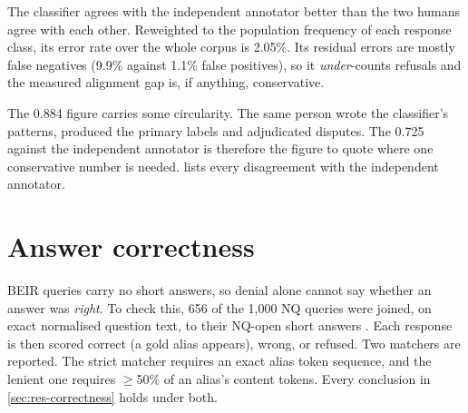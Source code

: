 The classifier agrees with the independent annotator better than the two humans
agree with each other. Reweighted to the population frequency of each response
class, its error rate over the whole corpus is 2.05\%. Its residual errors are
mostly false negatives (9.9\% against 1.1\% false positives), so it
\emph{under}-counts refusals and the measured alignment gap is, if anything,
conservative.

The 0.884 figure carries some circularity. The same person wrote the
classifier's patterns, produced the primary labels and adjudicated disputes. The
0.725 against the independent annotator is therefore the figure to quote where
one conservative number is needed.  lists every
disagreement with the independent annotator.

\section{Answer correctness}
\label{sec:correctness}

BEIR queries carry no short answers, so denial alone cannot say whether an
answer was \emph{right}. To check this, 656 of the 1{,}000 NQ queries were
joined, on exact normalised question text, to their NQ-open short answers
\cite{lee2019latent}. Each response is then scored correct (a gold alias
appears), wrong, or refused. Two matchers are reported. The strict matcher
requires an exact alias token sequence, and the lenient one requires $\geq$50\%
of an alias's content tokens. Every conclusion in \cref{sec:res-correctness}
holds under both.
